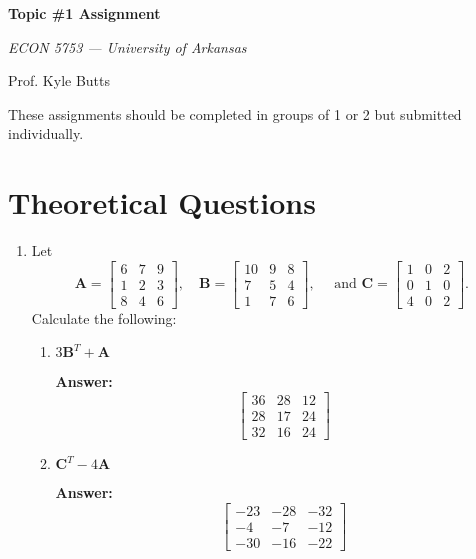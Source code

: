 \documentclass[12pt]{article}
\newcommand{\answer}[1]{{\color{blue_winged_teal}\textbf{Answer:} #1}}
\begin{document}
\begin{center}
  {\Huge\bf Topic \#1 Assignment}
  
  \smallskip
  {\large\it  ECON 5753 — University of Arkansas}

  \medskip
  {\large Prof. Kyle Butts}
\end{center}

These assignments should be completed in groups of 1 or 2 but submitted individually. 

\section*{Theoretical Questions}

\begin{enumerate}
  \item Let 
  $$
    \bm{A} = \begin{bmatrix} 6 & 7 & 9 \\ 1 & 2 & 3 \\ 8 & 4 & 6 \end{bmatrix}, 
    \quad 
    \bm{B} = \begin{bmatrix} 10 & 9 & 8 \\ 7 & 5 & 4 \\ 1 & 7 & 6 \end{bmatrix},
    \quad \text{ and } 
    \bm{C} = \begin{bmatrix} 1 & 0 & 2 \\ 0 & 1 & 0 \\ 4 & 0 & 2 \end{bmatrix}.
  $$ 
  Calculate the following:
  
  \begin{enumerate}
    \item $3\bm{B}^T + \bm{A}$
    
    \answer{
      $$
        \begin{bmatrix}
          36 & 28 & 12 \\ 
          28 & 17 & 24 \\ 
          32 & 16 & 24 
        \end{bmatrix}
      $$
    }
    
    \item $\bm{C}^T - 4\bm{A}$
    
    \answer{
      $$
        \begin{bmatrix}
          -23 & -28 & -32 \\ 
          -4 & -7 & -12 \\ 
          -30 & -16 & -22
        \end{bmatrix}
      $$
    }
    

\end{enumerate}
\end{enumerate}
\end{document}
